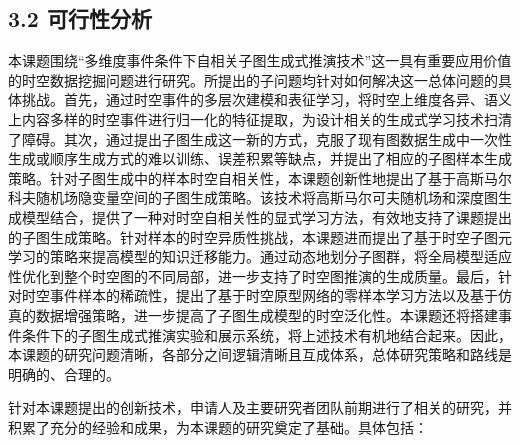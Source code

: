 \documentclass[12pt,UTF8,AutoFakeBold=2,a4paper]{ctexart} %
\begin{document}
\subsection{3.2 可行性分析}
本课题围绕``多维度事件条件下自相关子图生成式推演技术''这一具有重要应用价值的时空数据挖掘问题进行研究。所提出的子问题均针对如何解决这一总体问题的具体挑战。首先，通过时空事件的多层次建模和表征学习，将时空上维度各异、语义上内容多样的时空事件进行归一化的特征提取，为设计相关的生成式学习技术扫清了障碍。其次，通过提出子图生成这一新的方式，克服了现有图数据生成中一次性生成或顺序生成方式的难以训练、误差积累等缺点，并提出了相应的子图样本生成策略。针对子图生成中的样本时空自相关性，本课题创新性地提出了基于高斯马尔科夫随机场隐变量空间的子图生成策略。该技术将高斯马尔可夫随机场和深度图生成模型结合，提供了一种对时空自相关性的显式学习方法，有效地支持了课题提出的子图生成策略。针对样本的时空异质性挑战，本课题进而提出了基于时空子图元学习的策略来提高模型的知识迁移能力。通过动态地划分子图群，将全局模型适应性优化到整个时空图的不同局部，进一步支持了时空图推演的生成质量。最后，针对时空事件样本的稀疏性，提出了基于时空原型网络的零样本学习方法以及基于仿真的数据增强策略，进一步提高了子图生成模型的时空泛化性。本课题还将搭建事件条件下的子图生成式推演实验和展示系统，将上述技术有机地结合起来。因此，本课题的研究问题清晰，各部分之间逻辑清晰且互成体系，总体研究策略和路线是明确的、合理的。

针对本课题提出的创新技术，申请人及主要研究者团队前期进行了相关的研究，并积累了充分的经验和成果，为本课题的研究奠定了基础。具体包括：
\end{document}
